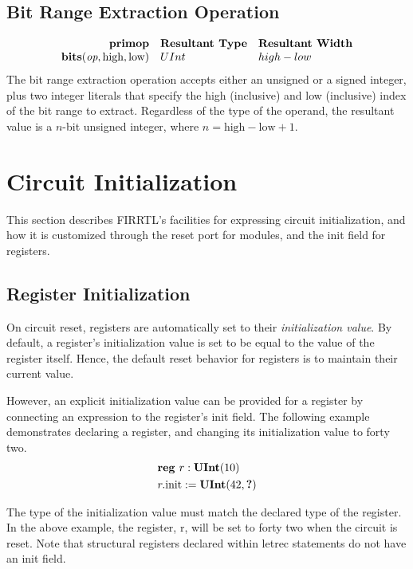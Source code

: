 \documentclass[12pt]{article}
\begin{document}
\subsection{Bit Range Extraction Operation}
\[
\begin{array}{rll}
\text{\bf primop} & \text{\bf Resultant Type} & \text{\bf Resultant Width} \\
\text{\bf bits}(\text{\em op}, \text{high}, \text{low})  & UInt & high - low    \\
\end{array}
\]
The bit range extraction operation accepts either an unsigned or a signed integer, plus two integer literals that specify the high (inclusive) and low (inclusive) index of the bit range to extract.
Regardless of the type of the operand, the resultant value is a $n$-bit unsigned integer, where $n = \text{high} - \text{low} + 1$. 

\section{Circuit Initialization} \label{initialization}

This section describes FIRRTL's facilities for expressing circuit initialization, and how it is customized through the reset port for modules, and the init field for registers. 

\subsection{Register Initialization}
On circuit reset, registers are automatically set to their {\em initialization value}.
By default, a register's initialization value is set to be equal to the value of the register itself.
Hence, the default reset behavior for registers is to maintain their current value.

However, an explicit initialization value can be provided for a register by connecting an expression to the register's init field.
The following example demonstrates declaring a register, and changing its initialization value to forty two.
\[
\begin{aligned}
& \text{\bf reg\ } r : \text{\bf UInt}(10) \\
& r.\text{init} := \text{\bf UInt}(42, \text{\bf ?})
\end{aligned}
\]

The type of the initialization value must match the declared type of the register.
In the above example, the register, r, will be set to forty two when the circuit is reset.
Note that structural registers declared within letrec statements do not have an init field.
\end{document}
